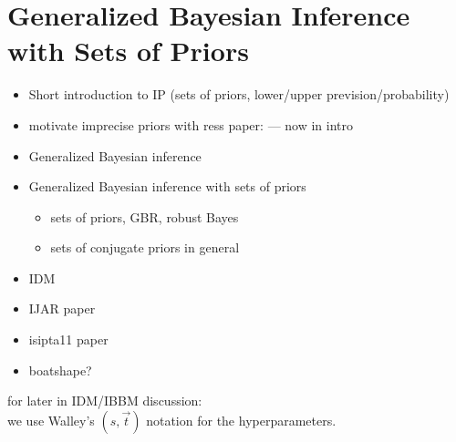 \chapter{Generalized Bayesian Inference with Sets of Priors}

\begin{itemize}
\item Short introduction to IP (sets of priors, lower/upper prevision/probability)
\item motivate imprecise priors with ress paper: \cite{Troffaes2013a} --- now in intro 
\item Generalized Bayesian inference
\item Generalized Bayesian inference with sets of priors
 \begin{itemize}
 \item sets of priors, GBR, robust Bayes
 \item sets of conjugate priors in general
 \end{itemize}
\item IDM
\item IJAR paper \cite{Walter2009a}
\item isipta11 paper \cite{Walter2011a}
\item boatshape?
\end{itemize}


for later in IDM/IBBM discussion:\\
we use Walley's \cite[\S 7.7.3, p.~395]{1991:walley} $(s,\vec{t})$ notation for the hyperparameters.
